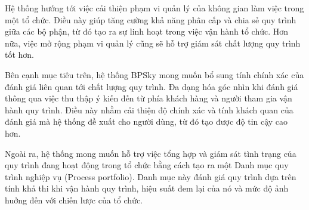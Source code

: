 
Hệ thống hướng tới việc cải thiện phạm vi quản lý của không gian làm việc trong một tổ chức. Điều này giúp tăng cường khả năng phân cấp và chia sẻ quy trình giữa các bộ phận, từ đó tạo ra sự linh hoạt trong việc vận hành tổ chức. Hơn nữa, việc mở rộng phạm vi quản lý cũng sẽ hỗ trợ giám sát chất lượng quy trình tốt hơn.

Bên cạnh mục tiêu trên, hệ thống BPSky mong muốn bổ sung tính chính xác của đánh giá liên quan tới chất lượng quy trình. Đa dạng hóa góc nhìn khi đánh giá thông qua việc thu thập ý kiến đến từ phía khách hàng và người tham gia vận hành quy trình. Điều này nhằm cải thiện độ chính xác và tính khách quan của đánh giá mà hệ thống đề xuất cho người dùng, từ đó tạo được độ tin cậy cao hơn.

Ngoài ra, hệ thống mong muốn hỗ trợ việc tổng hợp và giám sát tình trạng của quy trình đang hoạt động trong tổ chức bằng cách tạo ra một Danh mục quy trình nghiệp vụ (Process portfolio). Danh mục này đánh giá quy trình dựa trên tính khả thi khi vận hành quy trình, hiệu suất đem lại của nó và mức độ ảnh huởng đến với chiến lược của tổ chức.